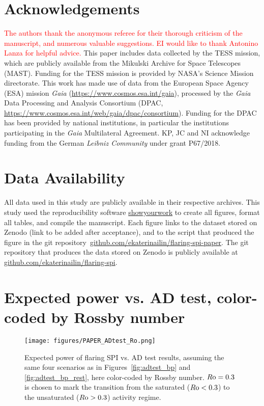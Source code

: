 \documentclass[twocolumn]{aastex631}
\begin{document}
\section*{Acknowledgements}
\textcolor{red}{The authors thank the anonymous referee for their thorough criticism of the manuscript, and numerous valuable suggestions. EI would like to thank Antonino Lanza for helpful advice.}
This paper includes data collected by the TESS mission, which are publicly available from the Mikulski Archive for Space Telescopes (MAST).
Funding for the TESS mission is provided by NASA’s Science Mission directorate. 
This work has made use of data from the European Space Agency (ESA) mission {\it Gaia} (\url{https://www.cosmos.esa.int/gaia}), processed by the {\it Gaia} Data Processing and Analysis Consortium (DPAC, \url{https://www.cosmos.esa.int/web/gaia/dpac/consortium}). Funding for the DPAC
has been provided by national institutions, in particular the institutions participating in the {\it Gaia} Multilateral Agreement.
KP, JC and NI acknowledge funding from the German \textit{Leibniz Community} under grant P67/2018.
\section*{Data Availability}
All data used in this study are publicly available in their respective archives.
This study used the reproducibility software \href{https://github.com/showyourwork/showyourwork}{showyourwork}
\citep{luger2021mappinga} to create all figures, format all tables, and compile the manuscript. Each figure links to the dataset stored on Zenodo (link to be added after acceptance), and to the script that produced the figure in the git repository~\href{https://github.com/ekaterinailin/flaring-spi-paper}{github.com/ekaterinailin/flaring-spi-paper}. The git repository that produces the data stored on Zenodo is publicly available at \href{https://github.com/ekaterinailin/flaring-spi}{github.com/ekaterinailin/flaring-spi}. 


\appendix
\restartappendixnumbering 


\section{Expected power vs. AD test, color-coded by Rossby number}
\begin{figure*}[ht!]
    \begin{centering}
        \texttt{[image: figures/PAPER\_ADtest\_Ro.png]}
        \caption{
        Expected power of flaring SPI vs. AD test results, assuming the same four scenarios as in Figures~\ref{fig:adtest_bp} and \ref{fig:adtest_bp_rest}, here color-coded by Rossby number. $R\rm o=0.3$ is chosen to mark the transition from the saturated ($R\rm o < 0.3$) to the unsaturated ($R\rm o > 0.3$) activity regime. 
        }
        \label{fig:adtest_ro}
    \end{centering}
\end{figure*}
\end{document}
